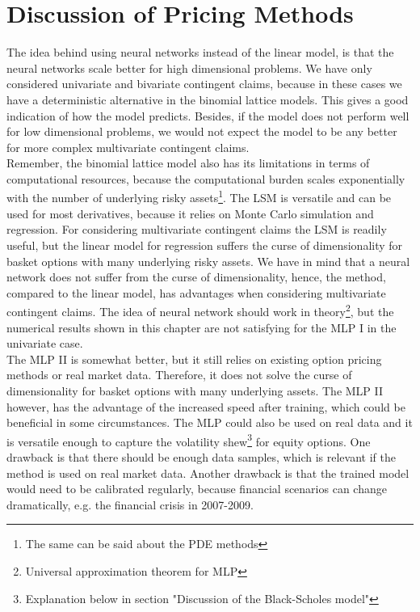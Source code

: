 \section{Discussion of Pricing Methods}
The idea behind using neural networks instead of the linear model, is that the neural networks scale better for high dimensional problems. We have only considered univariate and bivariate contingent claims, because in these cases we have a deterministic alternative in the binomial lattice models. This gives a good indication of how the model predicts. Besides, if the model does not perform well for low dimensional problems, we would not expect the model to be any better for more complex multivariate contingent claims.\\

Remember, the binomial lattice model also has its limitations in terms of computational resources, because the computational burden scales exponentially with the number of underlying risky assets\footnote{The same can be said about the PDE methods}. The LSM is versatile and can be used for most derivatives, because it relies on Monte Carlo simulation and regression. For considering multivariate contingent claims the LSM is readily useful, but the linear model for regression suffers the curse of dimensionality for basket options with many underlying risky assets. We have in mind that a neural network does not suffer from the curse of dimensionality, hence, the method, compared to the linear model, has advantages when considering multivariate contingent claims. The idea of neural network should work in theory\footnote{Universal approximation theorem for MLP}, but the numerical results shown in this chapter are not satisfying for the MLP I in the univariate case.\\

The MLP II is somewhat better, but it still relies on existing option pricing methods or real market data. Therefore, it does not solve the curse of dimensionality for basket options with many underlying assets. The MLP II however, has the advantage of the increased speed after training, which could be beneficial in some circumstances. The MLP could also be used on real data and it is versatile enough to capture the volatility shew\footnote{Explanation below in section "Discussion of the Black-Scholes model"} for equity options. One drawback is that there should be enough data samples, which is relevant if the method is used on real market data. Another drawback is that the trained model would need to be calibrated regularly, because financial scenarios can change dramatically, e.g. the financial crisis in 2007-2009.\\

